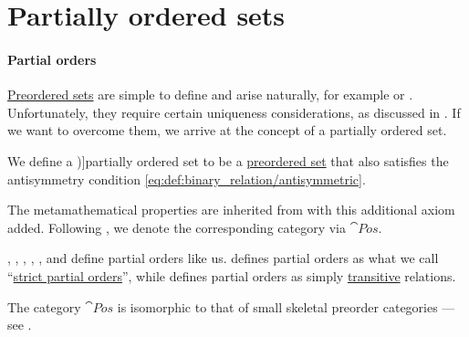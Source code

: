 \section{Partially ordered sets}\label{sec:partially_ordered_sets}

\paragraph{Partial orders}

\hyperref[def:preordered_set]{Preordered sets} are simple to define and arise naturally, for example  or . Unfortunately, they require certain uniqueness considerations, as discussed in . If we want to overcome them, we arrive at the concept of a partially ordered set.

\begin{definition}\label{def:partially_ordered_set}
  We define a \term[ru=частично упорядоченное множество (\cite[72]{Гуров2013Решётки})]{partially ordered set} to be a \hyperref[def:preordered_set]{preordered set} that also satisfies the antisymmetry condition \eqref{eq:def:binary_relation/antisymmetric}.

  The metamathematical properties are inherited from  with this additional axiom added. Following , we denote the corresponding category via \( \cat{Pos} \).
\end{definition}
\begin{comments}
  \item {}, , , , ,  and  define partial orders like us.  defines partial orders as what we call \enquote{\hyperref[def:strict_partial_order]{strict partial orders}}, while  defines partial orders as simply \hyperref[def:binary_relation/transitive]{transitive} relations.

  \item The category \( \cat{Pos} \) is isomorphic to that of small skeletal preorder categories --- see .
\end{comments}

